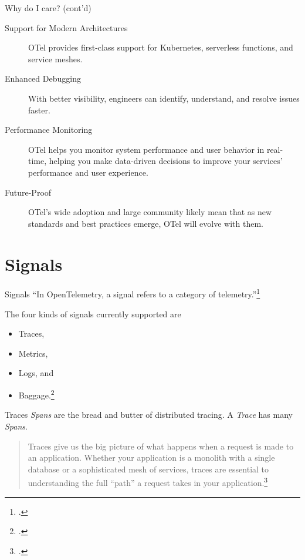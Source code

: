 \documentclass[aspectratio=169]{beamer}
\begin{document}
\begin{frame}{Why do I care? (cont'd)}
  \begin{description}
    \item[Support for Modern Architectures] OTel provides first-class support
      for Kubernetes, serverless functions, and service meshes.
    \item[Enhanced Debugging] With better visibility, engineers can identify,
      understand, and resolve issues faster.
    \item[Performance Monitoring] OTel helps you monitor system performance and
      user behavior in real-time, helping you make data-driven decisions to
      improve your services' performance and user experience.
    \item[Future-Proof] OTel's wide adoption and large community likely mean
      that as new standards and best practices emerge, OTel will evolve with them.
  \end{description}
\end{frame}

\section{Signals}

\begin{frame}{Signals}
  ``In OpenTelemetry, a signal refers to a category of telemetry.''\footcite{otel-signals}

  \vspace{1em}

  The four kinds of signals currently supported are

  \begin{itemize}
    \item Traces,
    \item Metrics,
    \item Logs, and
    \item Baggage.\footcite{otel-signals}
  \end{itemize}
\end{frame}

\begin{frame}{Traces}
  \emph{Spans} are the bread and butter of distributed tracing. A \emph{Trace}
  has many \emph{Spans}.

  \vspace{1em}

  \begin{quote}
    Traces give us the big picture of what happens when a request is made to an
    application. Whether your application is a monolith with a single database
    or a sophisticated mesh of services, traces are essential to understanding
    the full ``path'' a request takes in your application.\footcite{otel-traces}
  \end{quote}
\end{frame}
\end{document}
